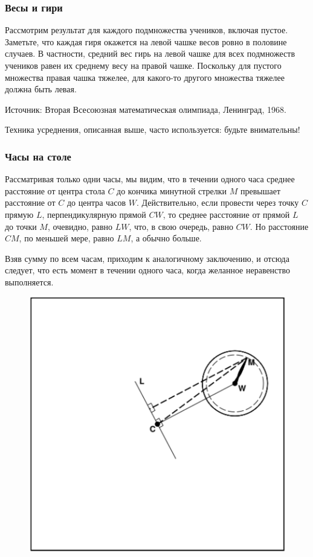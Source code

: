 \subsubsection*{Весы и гири} %

Рассмотрим результат для каждого подмножества учеников, включая пустое.
Заметьте, что каждая гиря окажется на левой чашке весов ровно в половине случаев.
В частности, средний вес гирь на левой чашке для всех подмножеств учеников равен их среднему весу на правой чашке.
Поскольку для пустого множества правая чашка тяжелее, 
для какого-то другого множества тяжелее должна быть левая.\heart

Источник: Вторая Всесоюзная математическая олимпиада, Ленинград, 1968.

Техника усреднения, описанная выше, часто используется: будьте внимательны!

\subsubsection*{Часы на столе} %

Рассматривая только одни часы, 
мы видим, что в течении одного часа среднее расстояние от центра стола $C$ до кончика минутной стрелки $M$ превышает расстояние от $C$ до центра часов $W$.
Действительно, если провести через точку $C$ прямую $L$, перпендикулярную прямой $CW$, 
то среднее расстояние от прямой $L$ до точки $M$, очевидно, равно $LW$, 
что, в свою очередь, равно $CW$.
Но расстояние $CM$, по меньшей мере, равно $LM$, а обычно больше.

Взяв сумму по всем часам, приходим к аналогичному заключению, и отсюда следует, что есть момент в течении одного часа, когда желанное неравенство выполняется.\heart

\begin{figure}[h!]
\centering
\includegraphics[scale=0.9]{Figs/Insight/watch}
\end{figure}

